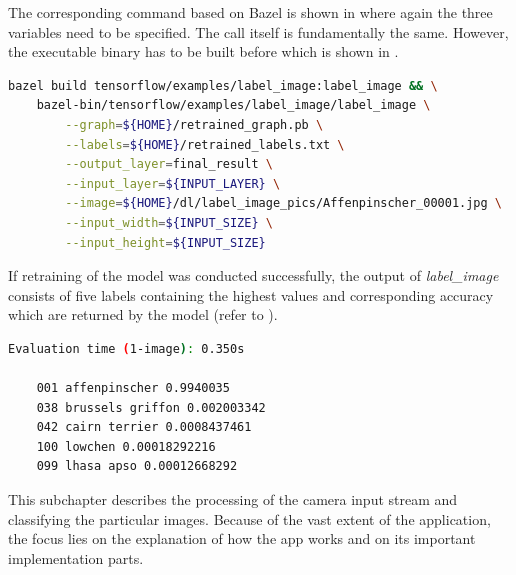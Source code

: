 The corresponding command based on Bazel is shown in  where again the three variables need to be specified. The call itself is fundamentally the same. However, the executable binary has to be built before which is shown in .

\begin{minipage}{\linewidth}
\begin{lstlisting}[caption=Build and call of \textit{label\_image}, label=list:blabel_image, language=bash]
	bazel build tensorflow/examples/label_image:label_image && \
	bazel-bin/tensorflow/examples/label_image/label_image \
		--graph=${HOME}/retrained_graph.pb \
		--labels=${HOME}/retrained_labels.txt \
		--output_layer=final_result \
		--input_layer=${INPUT_LAYER} \
		--image=${HOME}/dl/label_image_pics/Affenpinscher_00001.jpg \
		--input_width=${INPUT_SIZE} \
		--input_height=${INPUT_SIZE}
\end{lstlisting}
\end{minipage}

If retraining of the model was conducted successfully, the output of \textit{label\_image} consists of five labels containing the highest values and corresponding accuracy which are returned by the model (refer to ).

\begin{minipage}{\linewidth}
\begin{lstlisting}[caption=Output of \textit{label\_image.py}, label=list:label_imageOutput, language=bash]
	Evaluation time (1-image): 0.350s
	
	001 affenpinscher 0.9940035
	038 brussels griffon 0.002003342
	042 cairn terrier 0.0008437461
	100 lowchen 0.00018292216
	099 lhasa apso 0.00012668292
\end{lstlisting}
\end{minipage}




This subchapter describes the processing of the camera input stream and classifying the particular images. Because of the vast extent of the application, the focus lies on the explanation of how the app works and on its important implementation parts. \\

